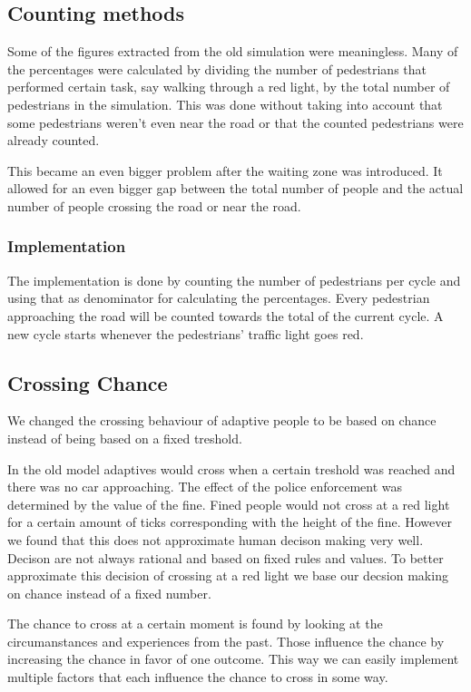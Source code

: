 \documentclass[a4paper]{article}
\begin{document}
\subsection{Counting methods}

Some of the figures extracted from the old simulation were meaningless. Many of the percentages were calculated by dividing the number of pedestrians that performed certain task, say walking through a red light, by the total number of pedestrians in the simulation. This was done without taking into account that some pedestrians weren't even near the road or that the counted pedestrians were already counted.

This became an even bigger problem after the waiting zone was introduced. It allowed for an even bigger gap between the total number of people and the actual number of people crossing the road or near the road.

\subsubsection{Implementation}
The implementation is done by counting the number of pedestrians per cycle and using that as denominator for calculating the percentages. Every pedestrian approaching the road will be counted towards the total of the current cycle. A new cycle starts whenever the pedestrians' traffic light goes red.


\subsection{Crossing Chance}
We changed the crossing behaviour of adaptive people to be based on chance instead of being based on a fixed treshold.

In the old model adaptives would cross when a certain treshold was reached and there was no car approaching. The effect of the police enforcement was determined by the value of the fine. Fined people would not cross at a red light for a certain amount of ticks corresponding with the height of the fine. However we found that this does not approximate human decison making very well. Decison are not always rational and based on fixed rules and values. To better approximate this decision of crossing at a red light we base our decsion making on chance instead of a fixed number. 

The chance to cross at a certain moment is found by looking at the circumanstances and experiences from the past. Those influence the chance by increasing the chance in favor of one outcome. This way we can easily implement multiple factors that each influence the chance to cross in some way. 
\end{document}
